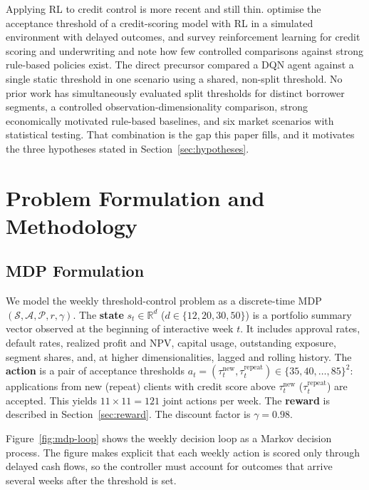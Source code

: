 \documentclass[preprint,review,authoryear,12pt]{elsarticle}
\begin{document}
Applying RL to credit control is more recent and still thin. \citet{herasymovych2019}
optimise the acceptance threshold of a credit-scoring model with RL in a simulated
environment with delayed outcomes, and \citet{kiatsupaibul2024} survey reinforcement
learning for credit scoring and underwriting and note how few controlled comparisons
against strong rule-based policies exist. The direct precursor \citep{herasymovych2019}
compared a DQN agent against a single static threshold in one scenario using a shared,
non-split threshold. No prior work has simultaneously evaluated split thresholds for
distinct borrower segments, a controlled observation-dimensionality comparison, strong
economically motivated rule-based baselines, and six market scenarios with statistical
testing. That combination is the gap this paper fills, and it motivates the three
hypotheses stated in Section~\ref{sec:hypotheses}.

\section{Problem Formulation and Methodology}

\subsection{MDP Formulation}

We model the weekly threshold-control problem as a discrete-time MDP
$(\mathcal{S}, \mathcal{A}, \mathcal{P}, r, \gamma)$. The \textbf{state}
$s_t \in \mathbb{R}^d$ ($d \in \{12, 20, 30, 50\}$) is a portfolio summary vector
observed at the beginning of interactive week $t$. It includes approval rates, default
rates, realized profit and NPV, capital usage, outstanding exposure, segment shares,
and, at higher dimensionalities, lagged and rolling history. The \textbf{action} is a
pair of acceptance thresholds
$a_t = (\tau^{\text{new}}_t, \tau^{\text{repeat}}_t) \in \{35, 40, \ldots, 85\}^2$:
applications from new (repeat) clients with credit score above $\tau^{\text{new}}_t$
($\tau^{\text{repeat}}_t$) are accepted. This yields $11 \times 11 = 121$ joint actions
per week. The \textbf{reward} is described in Section~\ref{sec:reward}. The discount
factor is $\gamma = 0.98$.

Figure~\ref{fig:mdp-loop} shows the weekly decision loop as a Markov decision process.
The figure makes explicit that each weekly action is scored only through delayed cash
flows, so the controller must account for outcomes that arrive several weeks after the
threshold is set.
\end{document}

